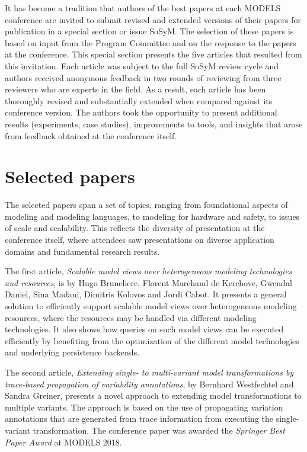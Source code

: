 \documentclass{svjour3}                     %
\begin{document}
It has become a tradition that authors of the best papers at each MODELS conference are invited to submit revised and extended versions of their papers for publication in a special section or issue SoSyM. The selection of these papers is based on input from the Program Committee and on the response to the papers at the conference.
This special section presents the five articles that resulted from this invitation. Each article was subject to the full SoSyM review cycle and authors received anonymous feedback in two rounds of reviewing from three reviewers who are experts in the field. As a result, each article has been thoroughly revised and substantially extended when compared against its conference version. The authors took the opportunity to present additional results (experiments, case studies), improvements to tools, and insights
that arose from feedback obtained at the conference itself.

\section{Selected papers}
The selected papers span a set of topics, ranging from foundational aspects of modeling and modeling languages, to modeling
for hardware and safety, to issues of scale and scalability. This reflects the diversity of presentation at the conference itself, where
attendees saw presentations on diverse application domains and fundamental research results.

The first article, \textit{Scalable model views over heterogeneous modeling technologies and resources}, is by 
Hugo Bruneliere, Florent Marchand de Kerchove, Gwendal Daniel, Sina Madani, Dimitris Kolovos and Jordi Cabot. It presents
a general solution to efficiently support scalable model views over heterogeneous modeling resources, where the resources may
be handled via different modeling technologies. It also shows how queries on such model
views can be executed efficiently by benefiting from the optimization of the
different model technologies and underlying persistence backends. 

The second article, \textit{Extending single- to multi-variant model transformations by trace-based propagation of variability annotations}, by
Bernhard Westfechtel and Sandra Greiner, presents a novel approach to extending model transformations to multiple variants. The approach is 
based on the use of propagating variation
annotations that are generated from trace information from executing the single-variant transformation. The conference paper was awarded the \textit{Springer
Best Paper Award} at MODELS 2018.
\end{document}
